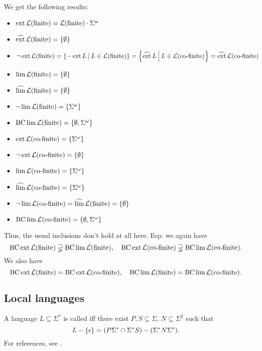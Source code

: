 We get the following results:
\begin{itemize}
\item $\operatorname{ext} \mathcal{L}(\textup{\textrm{finite}}) = \mathcal{L}(\textup{\textrm{finite}}) \cdot \Sigma^\omega$
\item $\dext \Lang(\mathtext{finite}) = \Set{\emptyset}$
\item $\neg\ext \Lang(\mathtext{finite}) = \Set{-\ext L}{L \in \Lang(\mathtext{finite})} = \Set{\dext L}{L \in \Lang(\mathtext{co-finite})} = \dext \Lang(\mathtext{co-finite})$
\item $\lim \Lang(\mathtext{finite}) = \Set{\emptyset}$
\item $\dlim \Lang(\mathtext{finite}) = \Set{\emptyset}$
\item $\neg\lim \Lang(\mathtext{finite}) = \Set{\Sigma^\omega}$
\item $\BC \lim \Lang(\mathtext{finite}) = \Set{\emptyset,\Sigma^\omega}$
\item $\ext \Lang(\mathtext{co-finite}) = \Set{\Sigma^\omega}$
\item $\neg\ext \Lang(\mathtext{co-finite}) = \Set{\emptyset}$
\item $\lim \Lang(\mathtext{co-finite}) = \Set{\Sigma^\omega}$
\item $\dlim \Lang(\mathtext{co-finite}) = \Set{\Sigma^\omega}$
\item $\neg\lim \Lang(\mathtext{co-finite}) = \dlim \Lang(\mathtext{finite}) = \Set{\emptyset}$
\item $\BC \lim \Lang(\mathtext{co-finite}) = \Set{\emptyset, \Sigma^\omega}$
\end{itemize}

Thus, the usual inclusions don't hold at all here. Esp. we again have
\[ \BC \ext \Lang(\mathtext{finite}) \supsetneqq \BC \lim \Lang(\mathtext{finite}) , \ \ \ 
\BC \ext \Lang(\mathtext{co-finite}) \supsetneqq \BC \lim \Lang(\mathtext{co-finite}) . \]
We also have
\[ \BC \ext \Lang(\mathtext{finite}) = \BC \ext \Lang(\mathtext{co-finite}) , \ \ \ 
\BC \lim \Lang(\mathtext{finite}) = \BC \lim \Lang(\mathtext{co-finite}) . \]

\subsection{Local languages}
\label{lang:local}
A language $L \subseteq \Sigma^*$ is called  iff there exist $P,S \subseteq \Sigma$, $N \subseteq \Sigma^2$ such that
\[ L - \Set{\epsilon} = (P\Sigma^* \cap \Sigma^* S) - (\Sigma^* N \Sigma^*). \]
For references, see \cite{Berstel1996439}.

